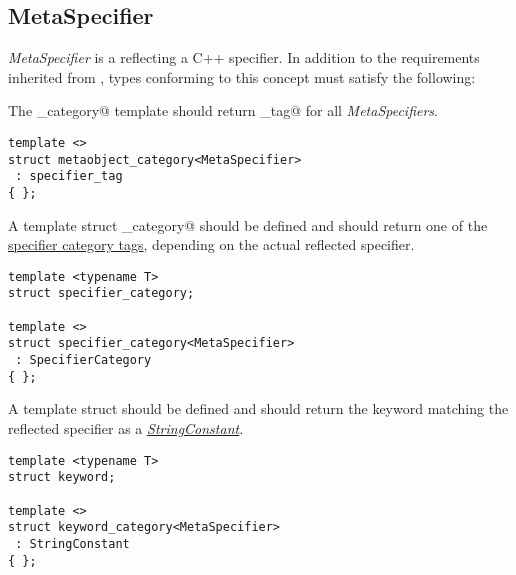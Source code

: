 \subsection{MetaSpecifier}
\label{concept-MetaSpecifier}

{\em MetaSpecifier} is a  reflecting a C++ specifier. In addition to the requirements
inherited from , types conforming to this concept must satisfy the following:

The \verb@metaobject_category@ template should return \verb@specifier_tag@ for all {\em MetaSpecifiers}.

\begin{lstlisting}
template <>
struct metaobject_category<MetaSpecifier>
 : specifier_tag
{ };
\end{lstlisting}

A template struct \verb@specifier_category@ should be defined and should return one of the
\hyperref[specifier-category-tags]{specifier category tags}, depending on
the actual reflected specifier.

\begin{lstlisting}
template <typename T>
struct specifier_category;

template <>
struct specifier_category<MetaSpecifier>
 : SpecifierCategory
{ };
\end{lstlisting}

A template struct \verb@keyword@ should be defined and should return
the keyword matching the reflected specifier as a
\hyperref[concept-StringConstant]{\em StringConstant}.

\begin{lstlisting}
template <typename T>
struct keyword;

template <>
struct keyword_category<MetaSpecifier>
 : StringConstant
{ };
\end{lstlisting}

